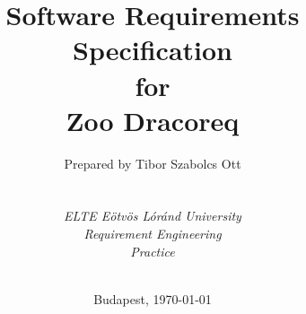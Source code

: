 
\def\Company{Consultancy}
\def\Institute{\textit{ELTE Eötvös Lóránd University}}
\def\Course{\textit{Requirement Engineering}}
\def\Module{\textit{Practice}}
\def\Docent{\textit{}}
\def\Assistant{\textit{}}

\def\BoldTitle{Software Requirements Specification}

\def\Subtitle{for \\ Zoo Dracoreq \\}
\def\Authors{Prepared by Tibor Szabolcs Ott  } 
\def\Shortname{T.Sz.Ott}


\title{\textbf{\BoldTitle}\\\Subtitle}
\author{\Authors \\ \\ \\ \Institute\\ \Course\\ \Module\\ \Docent\\ \Assistant}
\date{Budapest, \today}


